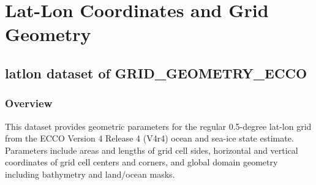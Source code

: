 \section{Lat-Lon Coordinates and Grid Geometry}
\subsection{latlon dataset of GRID\_GEOMETRY\_ECCO}
\newp
\subsubsection{Overview}
This dataset provides geometric parameters for the regular 0.5-degree lat-lon grid from the ECCO Version 4 Release 4 (V4r4) ocean and sea-ice state estimate. Parameters include areas and lengths of grid cell sides, horizontal and vertical coordinates of grid cell centers and corners, and global domain geometry including bathymetry and land/ocean masks.
\\\\
